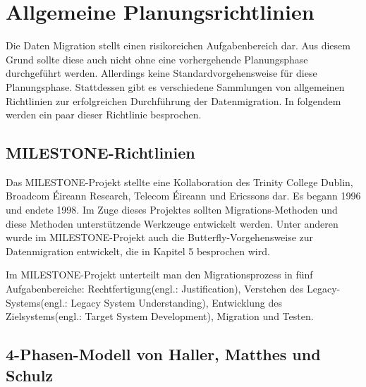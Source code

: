 \section{Allgemeine Planungsrichtlinien}

Die Daten Migration stellt einen risikoreichen Aufgabenbereich dar. Aus diesem Grund sollte diese auch nicht ohne eine vorhergehende Planungsphase durchgeführt werden. Allerdings keine Standardvorgehensweise für diese Planungsphase.\cite[vgl.][S. 3]{wuLawless-1997} Stattdessen gibt es verschiedene Sammlungen von allgemeinen Richtlinien zur erfolgreichen Durchführung der Datenmigration. In folgendem werden ein paar dieser Richtlinie besprochen.

\subsection{MILESTONE-Richtlinien}


Das MILESTONE-Projekt stellte eine Kollaboration des Trinity College Dublin, Broadcom Éireann Research, Telecom Éireann und Ericssons dar. Es begann 1996 und endete 1998. Im Zuge dieses Projektes sollten Migrations-Methoden und diese Methoden unterstützende Werkzeuge entwickelt werden.\cite[vgl.][S. 3]{wuLawless-1997} Unter anderen wurde im MILESTONE-Projekt auch die Butterfly-Vorgehensweise zur Datenmigration entwickelt, die in Kapitel 5 besprochen wird.\cite[vgl.][S. 3]{wuLawless-1997} 

Im MILESTONE-Projekt unterteilt man den Migrationsprozess in fünf Aufgabenbereiche: Rechtfertigung(engl.: Justification), Verstehen des Legacy-Systems(engl.: Legacy System Understanding), Entwicklung des Zielsystems(engl.: Target System Development), Migration und Testen.\cite[vgl.][S. 3]{wuLawless-1997} 


\subsection{4-Phasen-Modell von Haller, Matthes und Schulz}
